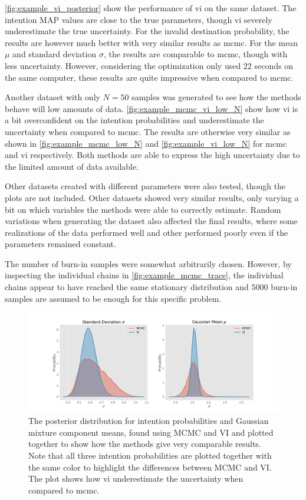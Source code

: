 \cref{fig:example_vi_posterior} show the performance of  \acrshort{vi} on the same dataset. The intention MAP values are close to the true parameters, though \acrshort{vi} severely underestimate the true uncertainty. For the invalid destination probability, the results are however much better with very similar results as \acrshort{mcmc}. For the mean $\mu$ and standard deviation $\sigma$, the results are comparable to \acrshort{mcmc}, though with less uncertainty. However, considering the optimization only used 22 seconds on the same computer, these results are quite impressive when compared to \acrshort{mcmc}.

Another dataset with only $N=50$ samples was generated to see how the methods behave will low amounts of data. \cref{fig:example_mcmc_vi_low_N} show how \acrshort{vi} is a bit overconfident on the intention probabilities and underestimate the uncertainty when compared to \acrshort{mcmc}. The results are otherwise very similar as shown in \cref{fig:example_mcmc_low_N} and \cref{fig:example_vi_low_N} for \acrshort{mcmc} and \acrshort{vi} respectively. Both methods are able to express the high uncertainty due to the limited amount of data available. 

Other datasets created with different parameters were also tested, though the plots are not included. Other datasets showed very similar results, only varying a bit on which variables the methods were able to correctly estimate. Random variations when generating the dataset also affected the final results, where some realizations of the data performed well and other performed poorly even if the parameters remained constant. 

The number of burn-in samples were somewhat arbitrarily chosen. However, by inspecting the individual chains in \cref{fig:example_mcmc_trace}, the individual chains appear to have reached the same stationary distribution and $5000$ burn-in samples are assumed to be enough for this specific problem.

\begin{figure}[h]
    \centering
    \includegraphics[width=\textwidth]{figures/example_vi_mcmc_comparison.png}
    \caption{The posterior distribution for intention probabilities and Gaussian mixture component means, found using MCMC and VI and plotted together to show how the methods give very comparable results. Note that all three intention probabilities are plotted together with the same color to highlight the differences between MCMC and VI. The plot shows how \acrshort{vi} underestimate the uncertainty when compared to \acrshort{mcmc}.}
    \label{fig:example_mcmc_vi_alphas}
\end{figure}

